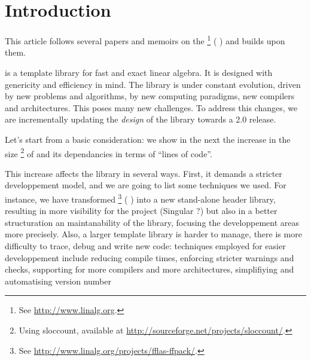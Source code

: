 \section{Introduction}
%
This article follows several papers and memoirs on the \linbox%
%
\footnote{See \url{http://www.linalg.org}.}
%
(\cf{} \cite{Giorgi:2004:these,Turner:2002:these,Boyer:2012:these,Dumas:2002:icms,Dumas:2010:lbpar})
and builds upon them.

is a \cpp template library for fast and exact linear algebra. It is designed with genericity
and efficiency in mind.
%
%
The \linbox library is under constant evolution, driven by new problems and
algorithms, by new computing paradigms, new compilers and architectures. This
poses many new challenges. To address this changes, we are incrementally
updating the \emph{design} of the library towards a \textsf{2.0} release.
%
\par
%
Let's start from a basic consideration: we show in the next  the
increase in the size%
%
\footnote{Using \textsf{sloccount}, available at
\url{http://sourceforge.net/projects/sloccount/}.}
%
of \linbox and its dependancies in terms of ``lines of code''.
%
%

%
This increase affects the library in several ways.  First, it demands a
stricter developpement model, and we are going to list some techniques we used.
For instance, we have transformed \fflasffpack %
%
\footnote{See \url{http://www.linalg.org/projects/fflas-ffpack/}.}
(\cf{} \cite{Dumas:2008:Flas}) into a new stand-alone header library, resulting
in more visibility for the \fflasffpack project (Singular ?) but also in a better
structuration an maintanability of the library, focusing the developpement
areas more precisely.
%
%
Also, a larger template library is harder to manage, there is more difficulty
to trace, debug and write new code: techniques employed
for easier developpement include reducing
compile times, enforcing stricter warnings and checks, supporting for more
compilers and more architectures, simplifiying and automatising version number

